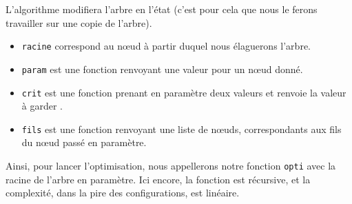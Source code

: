 			L'algorithme modifiera l'arbre en l'état (c'est pour cela que nous le ferons travailler sur une copie de l'arbre).

		\begin{itemize}
			\item \verb|racine| correspond au nœud à partir duquel nous élaguerons l'arbre.
			\item \verb|param| est une fonction renvoyant une valeur pour un nœud donné.
			\item \verb|crit| est une fonction prenant en paramètre deux valeurs et renvoie la valeur à \og garder \fg.
			\item \verb|fils| est une fonction renvoyant une liste de nœuds, correspondants aux fils du nœud passé en paramètre.
		\end{itemize}

			Ainsi, pour lancer l'optimisation, nous appellerons notre fonction \verb|opti| avec la racine de l'arbre en paramètre.
			Ici encore, la fonction est récursive, et la complexité, dans la pire des configurations, est linéaire.

	
